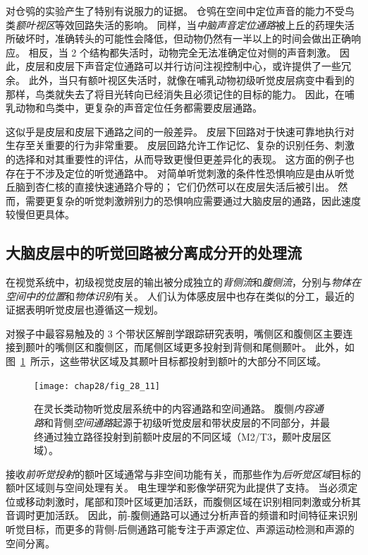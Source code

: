 对仓鸮的实验产生了特别有说服力的证据。
仓鸮在空间中定位声音的能力不受鸟类\textit{额叶视区}等效回路失活的影响。
同样，当\textit{中脑声音定位通路}被上丘的药理失活所破坏时，准确转头的可能性会降低，但动物仍然有一半以上的时间会做出正确响应。
相反，当 2 个结构都失活时，动物完全无法准确定位对侧的声音刺激。
因此，皮层和皮层下声音定位通路可以并行访问注视控制中心，或许提供了一些冗余。
此外，当只有额叶视区失活时，就像在哺乳动物初级听觉皮层病变中看到的那样，鸟类就失去了将目光转向已经消失且必须记住的目标的能力。
因此，在哺乳动物和鸟类中，更复杂的声音定位任务都需要皮层通路。


这似乎是皮层和皮层下通路之间的一般差异。
皮层下回路对于快速可靠地执行对生存至关重要的行为非常重要。
皮层回路允许工作记忆、复杂的识别任务、刺激的选择和对其重要性的评估，从而导致更慢但更差异化的表现。
这方面的例子也存在于不涉及定位的听觉通路中。
对简单听觉刺激的条件性恐惧响应是由从听觉丘脑到杏仁核的直接快速通路介导的；
它们仍然可以在皮层失活后被引出。
然而，需要更复杂的听觉刺激辨别力的恐惧响应需要通过大脑皮层的通路，因此速度较慢但更具体。



\subsection{大脑皮层中的听觉回路被分离成分开的处理流}

在视觉系统中，初级视觉皮层的输出被分成独立的\textit{背侧流}和\textit{腹侧流}，分别与\textit{物体在空间中的位置}和\textit{物体识别}有关。
人们认为体感皮层中也存在类似的分工，最近的证据表明听觉皮层也遵循这一规划。


对猴子中最容易触及的 3 个带状区解剖学跟踪研究表明，嘴侧区和腹侧区主要连接到颞叶的嘴侧区和腹侧区，而尾侧区域更多投射到背侧和尾侧颞叶。
此外，如图~\ref{fig:28_11}~所示，这些带状区域及其颞叶目标都投射到额叶的大部分不同区域。


\begin{figure}[htbp]
	\centering
	\texttt{[image: chap28/fig\_28\_11]}
	\caption{在灵长类动物听觉皮层系统中的内容通路和空间通路。
		腹侧\textit{内容通路}和背侧\textit{空间通路}起源于初级听觉皮层和带状皮层的不同部分，并最终通过独立路径投射到前额叶皮层的不同区域\cite{rauschecker2000mechanisms}（M2/T3，颞叶皮层区域）。}
	\label{fig:28_11}
\end{figure}


接收\textit{前听觉投射}的额叶区域通常与非空间功能有关，而那些作为\textit{后听觉区域}目标的额叶区域则与空间处理有关。
电生理学和影像学研究为此提供了支持。
当必须定位或移动刺激时，尾部和顶叶区域更加活跃，而腹侧区域在识别相同刺激或分析其音调时更加活跃。
因此，前-腹侧通路可以通过分析声音的频谱和时间特征来识别听觉目标，而更多的背侧-后侧通路可能专注于声源定位、声源运动检测和声源的空间分离。


